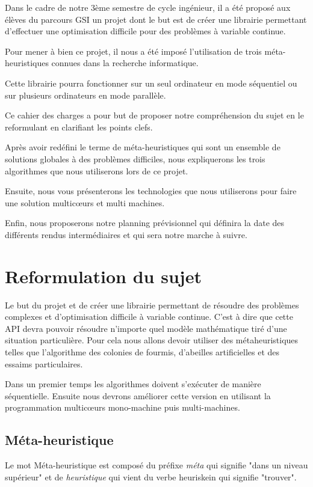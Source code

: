 \documentclass[12pt]{article}
\begin{document}
Dans le cadre de notre 3ème semestre de cycle ingénieur, il a été proposé aux élèves du parcours GSI un projet dont le but est de créer une librairie permettant d'effectuer une optimisation difficile pour des problèmes à variable continue.

Pour mener à bien ce projet, il nous a été imposé l'utilisation de trois méta-heuristiques connues dans la recherche informatique. 

Cette librairie pourra fonctionner sur un seul ordinateur en mode séquentiel ou sur plusieurs ordinateurs en mode parallèle. 

Ce cahier des charges a pour but de proposer notre compréhension du sujet en le reformulant en clarifiant les points clefs. 

Après avoir redéfini le terme de méta-heuristiques qui sont un ensemble de solutions globales à des problèmes difficiles, nous expliquerons les trois algorithmes que nous utiliserons lors de ce projet. 

Ensuite, nous vous présenterons les technologies que nous utiliserons pour faire une solution multicœurs et multi machines. 

Enfin, nous proposerons notre planning prévisionnel qui définira la date des différents rendus intermédiaires et qui sera notre marche à suivre. 

\section{Reformulation du sujet}
	Le but du projet et de créer une librairie permettant de résoudre des problèmes complexes et d'optimisation difficile à variable continue. C'est à dire que cette API devra pouvoir résoudre n'importe quel modèle mathématique tiré d'une situation particulière. Pour cela nous allons devoir utiliser des métaheuristiques telles que l'algorithme des colonies de fourmis, d'abeilles artificielles et des essaims particulaires.
    
Dans un premier temps les algorithmes doivent s'exécuter de manière séquentielle. Ensuite nous devrons améliorer cette version en utilisant la programmation multicœurs mono-machine puis multi-machines.

   
    

\subsection{Méta-heuristique}

Le mot Méta-heuristique est composé du préfixe \textit{méta} qui signifie "dans un niveau supérieur" et de \textit{heuristique} qui vient du verbe heuriskein qui signifie "trouver". 
\end{document}
